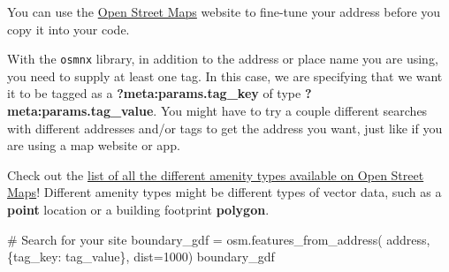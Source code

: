 \documentclass[
  letterpaper,
  DIV=11,
  numbers=noendperiod,
  oneside]{scrreprt}
\newenvironment{Shaded}{\begin{snugshade}}{\end{snugshade}}
\newcommand{\CommentTok}[1]{\textcolor[rgb]{0.37,0.37,0.37}{#1}}
\newcommand{\DecValTok}[1]{\textcolor[rgb]{0.68,0.00,0.00}{#1}}
\newcommand{\NormalTok}[1]{\textcolor[rgb]{0.00,0.23,0.31}{#1}}
\newcommand{\OperatorTok}[1]{\textcolor[rgb]{0.37,0.37,0.37}{#1}}
\begin{document}
\begin{tcolorbox}[enhanced jigsaw, colbacktitle=quarto-callout-tip-color!10!white, opacityback=0, bottomtitle=1mm, toptitle=1mm, bottomrule=.15mm, left=2mm, colframe=quarto-callout-tip-color-frame, leftrule=.75mm, opacitybacktitle=0.6, colback=white, rightrule=.15mm, toprule=.15mm, breakable, titlerule=0mm, title=\textcolor{quarto-callout-tip-color}{\faLightbulb}\hspace{0.5em}{Tip}, coltitle=black, arc=.35mm]

You can use the \href{https://www.openstreetmap.org/}{Open Street Maps}
website to fine-tune your address before you copy it into your code.

\end{tcolorbox}

With the \texttt{osmnx} library, in addition to the address or place
name you are using, you need to supply at least one tag. In this case,
we are specifying that we want it to be tagged as a
\textbf{?meta:params.tag\_key} of type \textbf{?meta:params.tag\_value}.
You might have to try a couple different searches with different
addresses and/or tags to get the address you want, just like if you are
using a map website or app.

\begin{tcolorbox}[enhanced jigsaw, colbacktitle=quarto-callout-tip-color!10!white, opacityback=0, bottomtitle=1mm, toptitle=1mm, bottomrule=.15mm, left=2mm, colframe=quarto-callout-tip-color-frame, leftrule=.75mm, opacitybacktitle=0.6, colback=white, rightrule=.15mm, toprule=.15mm, breakable, titlerule=0mm, title=\textcolor{quarto-callout-tip-color}{\faLightbulb}\hspace{0.5em}{Tip}, coltitle=black, arc=.35mm]

Check out the
\href{https://wiki.openstreetmap.org/wiki/Key:amenity}{list of all the
different amenity types available on Open Street Maps}! Different
amenity types might be different types of vector data, such as a
\textbf{point} location or a building footprint \textbf{polygon}.

\end{tcolorbox}

\begin{Shaded}
\begin{Highlighting}[]
\CommentTok{\# Search for your site}
\NormalTok{boundary\_gdf }\OperatorTok{=}\NormalTok{ osm.features\_from\_address(}
\NormalTok{    address,}
\NormalTok{    \{tag\_key: tag\_value\},}
\NormalTok{    dist}\OperatorTok{=}\DecValTok{1000}\NormalTok{)}
\NormalTok{boundary\_gdf}
\end{Highlighting}
\end{Shaded}
\end{document}
